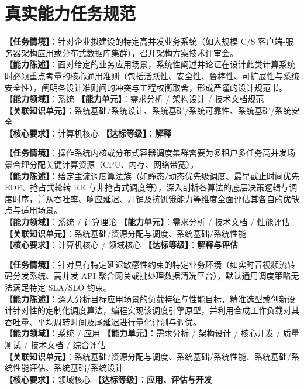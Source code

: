 \section{真实能力任务规范}

\begin{taskbox}[任务 1：阐述系统设计的通用设计准则]
\textbf{【任务情境】}：针对企业拟建设的特定高并发业务系统（如大规模 C/S 客户端-服务器架构应用或分布式数据库集群），召开架构方案技术评审会。\\
\textbf{【能力陈述】}：面对给定的业务应用场景，系统性阐述并论证在设计此类计算系统时必须重点考量的核心通用准则（包括活跃性、安全性、鲁棒性、可扩展性与系统安全性），阐明各设计准则间的冲突与工程权衡取舍，形成严谨的设计规范书。\\
\textbf{【能力领域】}：系统 \quad \textbf{【能力单元】}：需求分析 / 架构设计 / 技术文档规范\\
\textbf{【关联知识单元】}：系统基础/系统设计、系统基础/系统可靠性、系统基础/系统安全\\
\textbf{【核心要求】}：计算机核心 \quad \textbf{【达标等级】}：\textbf{解释}
\end{taskbox}

\begin{taskbox}[任务 2：剖析与对比不同资源调度算法机制]
\textbf{【任务情境】}：操作系统内核或分布式容器调度集群需要为多租户多任务高并发场景合理分配关键计算资源（CPU、内存、网络带宽）。\\
\textbf{【能力陈述】}：给定主流调度算法族（如静态/动态优先级调度、最早截止时间优先 EDF、抢占式轮转 RR 与非抢占式调度等），深入剖析各算法的底层决策逻辑与调度时序，并从吞吐率、响应延迟、开销及抗饥饿能力等维度全面评估其各自的优缺点与适用场景。\\
\textbf{【能力领域】}：系统 / 计算理论 \quad \textbf{【能力单元】}：需求分析 / 技术文档 / 性能评估\\
\textbf{【关联知识单元】}：系统基础/资源分配与调度、系统基础/系统性能\\
\textbf{【核心要求】}：计算机核心 / 领域核心 \quad \textbf{【达标等级】}：\textbf{解释与评估}
\end{taskbox}

\begin{taskbox}[任务 3：面向特定应用场景选择并实现调度算法]
\textbf{【任务情境】}：针对具有特定延迟敏感性约束的特定业务环境（如实时音视频流转码分发系统、高并发 API 聚合网关或批处理数据清洗平台），默认通用调度策略无法满足特定 SLA/SLO 约束。\\
\textbf{【能力陈述】}：深入分析目标应用场景的负载特征与性能目标，精准选型或创新设计针对性的定制化调度算法，编程实现该调度引擎原型，并利用合成工作负载对其吞吐量、平均周转时间及尾延迟进行量化评测与调优。\\
\textbf{【能力领域】}：系统 / 应用 \quad \textbf{【能力单元】}：需求分析 / 架构设计 / 核心开发 / 质量测试 / 技术文档 / 综合评估\\
\textbf{【关联知识单元】}：系统基础/资源分配与调度、系统基础/系统性能、系统基础/系统性能评估、系统基础/系统设计\\
\textbf{【核心要求】}：领域核心 \quad \textbf{【达标等级】}：\textbf{应用、评估与开发}
\end{taskbox}

